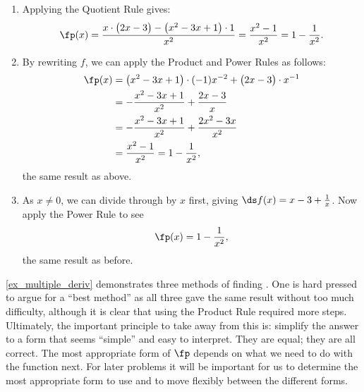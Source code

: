 {\begin{enumerate}
	\item	Applying the Quotient Rule gives:
	\[\fp(x) = \frac{x\cdot\big(2x-3\big)-\big(x^2-3x+1\big)\cdot 1}{x^2} = \frac{x^2-1}{x^2} = 1-\frac{1}{x^2}.\]
	\item	By rewriting $f$, we can apply the Product and Power Rules as follows:
	\begin{align*}
		\fp(x)
		&= \big(x^2-3x+1\big)\cdot (-1)x^{-2} + \big(2x-3\big)\cdot x^{-1} \\
		&= -\frac{x^2-3x+1}{x^2}+\frac{2x-3}{x} \\
		&= -\frac{x^2-3x+1}{x^2}+\frac{2x^2-3x}{x^2}\\
		&= \frac{x^2-1}{x^2} = 1-\frac{1}{x^2},
	\end{align*}
	the same result as above.
	\item	As $x\neq 0$, we can divide through by $x$ first, giving $\ds f(x) = x-3+\frac{1}x$. Now apply the Power Rule to see
	\[\fp(x) = 1-\frac{1}{x^2},\]
	the same result as before.\eoehere
\end{enumerate}}

\autoref{ex_multiple_deriv} demonstrates three methods of finding \fp. One is hard pressed to argue for a ``best method'' as all three gave the same result without too much difficulty, although it is clear that using the Product Rule required more steps. Ultimately, the important principle to take away from this is: simplify the answer to a form that seems ``simple'' and easy to interpret.  They are equal; they are all correct. The most appropriate form of $\fp$ depends on what we need to do with the function next. For later problems it will be important for us to determine the most appropriate form to use and to move flexibly between the different forms.
		
